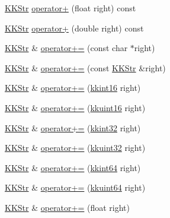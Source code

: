 \begin{DoxyCompactItemize}
\item 
\hyperlink{class_k_k_b_1_1_k_k_str}{K\+K\+Str} \hyperlink{class_k_k_b_1_1_k_k_str_adcc581d7ef01f34785f872780016cb71}{operator+} (float right) const 
\item 
\hyperlink{class_k_k_b_1_1_k_k_str}{K\+K\+Str} \hyperlink{class_k_k_b_1_1_k_k_str_a3267349bcf1111ea89ab3ee94e0439ab}{operator+} (double right) const 
\item 
\hyperlink{class_k_k_b_1_1_k_k_str}{K\+K\+Str} \& \hyperlink{class_k_k_b_1_1_k_k_str_a387cc71885f8b29531ec98cb70b86861}{operator+=} (const char $\ast$right)
\item 
\hyperlink{class_k_k_b_1_1_k_k_str}{K\+K\+Str} \& \hyperlink{class_k_k_b_1_1_k_k_str_a7d0802f1fd84559ecec17b60354df409}{operator+=} (const \hyperlink{class_k_k_b_1_1_k_k_str}{K\+K\+Str} \&right)
\item 
\hyperlink{class_k_k_b_1_1_k_k_str}{K\+K\+Str} \& \hyperlink{class_k_k_b_1_1_k_k_str_a9fb3e4d84ddfdf3ff0a8c0cd413f061a}{operator+=} (\hyperlink{namespace_k_k_b_a93809780ee294124dda4c23069f41248}{kkint16} right)
\item 
\hyperlink{class_k_k_b_1_1_k_k_str}{K\+K\+Str} \& \hyperlink{class_k_k_b_1_1_k_k_str_a1a6bd15b5264b55cb1c427d6657f1801}{operator+=} (\hyperlink{namespace_k_k_b_aa8c7d4d30381c8a0b6fce68974a9c8a9}{kkuint16} right)
\item 
\hyperlink{class_k_k_b_1_1_k_k_str}{K\+K\+Str} \& \hyperlink{class_k_k_b_1_1_k_k_str_ad744e3c19d6aad4ac937988370f0560c}{operator+=} (\hyperlink{namespace_k_k_b_a8fa4952cc84fda1de4bec1fbdd8d5b1b}{kkint32} right)
\item 
\hyperlink{class_k_k_b_1_1_k_k_str}{K\+K\+Str} \& \hyperlink{class_k_k_b_1_1_k_k_str_a82d77ff44fc926973ccfc1be7d90fb05}{operator+=} (\hyperlink{namespace_k_k_b_af8d832f05c54994a1cce25bd5743e19a}{kkuint32} right)
\item 
\hyperlink{class_k_k_b_1_1_k_k_str}{K\+K\+Str} \& \hyperlink{class_k_k_b_1_1_k_k_str_ad20cf0a0eb44b44f458c117c15941578}{operator+=} (\hyperlink{namespace_k_k_b_aa3486b1c5ea9162b3b020c69f72826eb}{kkint64} right)
\item 
\hyperlink{class_k_k_b_1_1_k_k_str}{K\+K\+Str} \& \hyperlink{class_k_k_b_1_1_k_k_str_af40fb20886a8539d9bb92b266eef2cdc}{operator+=} (\hyperlink{namespace_k_k_b_a1f2b0568d3b63cc7697dcff73250113e}{kkuint64} right)
\item 
\hyperlink{class_k_k_b_1_1_k_k_str}{K\+K\+Str} \& \hyperlink{class_k_k_b_1_1_k_k_str_a66ac539a66f4df8813ebba733528d9d4}{operator+=} (float right)
\item 

\end{DoxyCompactItemize}
